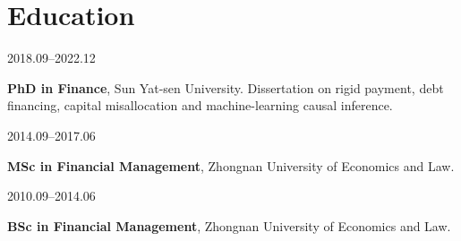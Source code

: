 \documentclass[10.5pt]{article}
\newcommand{\cvrow}[2]{%
  \par\noindent\needspace{2\baselineskip}%
  \begin{minipage}[t]{0.18\linewidth}\raggedright\sff\footnotesize\color{plum}#1\end{minipage}%
  \hfill\begin{minipage}[t]{0.80\linewidth}#2\end{minipage}%
  \par\addvspace{4.3pt}}
\begin{document}
\section{Education}
\cvrow{2018.09--2022.12}{\textbf{PhD in Finance}, Sun Yat-sen University. Dissertation on rigid payment, debt financing, capital misallocation and machine-learning causal inference.}
\cvrow{2014.09--2017.06}{\textbf{MSc in Financial Management}, Zhongnan University of Economics and Law.}
\cvrow{2010.09--2014.06}{\textbf{BSc in Financial Management}, Zhongnan University of Economics and Law.}
\end{document}
